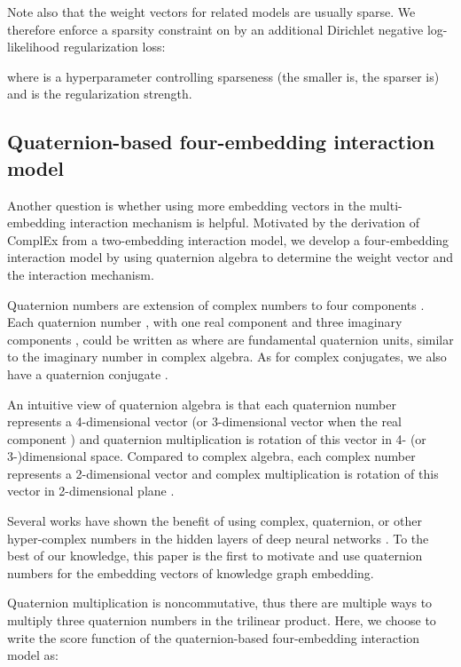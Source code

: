 \documentclass[sigconf,edbt]{acmart-edbt2019}
\begin{document}
Note also that the weight vectors for related models are usually sparse. We therefore enforce a sparsity constraint on  by an additional Dirichlet negative log-likelihood regularization loss:

where  is a hyperparameter controlling sparseness (the smaller  is, the sparser  is) and  is the regularization strength.


\subsection{Quaternion-based four-embedding interaction model}
Another question is whether using more embedding vectors in the multi-embedding interaction mechanism is helpful. Motivated by the derivation of ComplEx from a two-embedding interaction model, we develop a four-embedding interaction model by using quaternion algebra to determine the weight vector and the interaction mechanism.

Quaternion numbers are extension of complex numbers to four components \cite{kantor_hypercomplexnumberselementary_1989} \cite{goldman_rethinkingquaternions_2010}. Each quaternion number , with one real component  and three imaginary components , could be written as  where  are fundamental quaternion units, similar to the imaginary number  in complex algebra. As for complex conjugates, we also have a quaternion conjugate .

An intuitive view of quaternion algebra is that each quaternion number represents a 4-dimensional vector (or 3-dimensional vector when the real component ) and quaternion multiplication is rotation of this vector in 4- (or 3-)dimensional space. Compared to complex algebra, each complex number represents a 2-dimensional vector and complex multiplication is rotation of this vector in 2-dimensional plane \cite{ahlfors_complexanalysisintroduction_1953}.

Several works have shown the benefit of using complex, quaternion, or other hyper-complex numbers in the hidden layers of deep neural networks \cite{guberman_complexvaluedconvolutional_2016} \cite{minemoto_feedforwardneural_2017} \cite{parcollet_quaternionrecurrentneural_2019}. To the best of our knowledge, this paper is the first to motivate and use quaternion numbers for the embedding vectors of knowledge graph embedding.

Quaternion multiplication is noncommutative, thus there are multiple ways to multiply three quaternion numbers in the trilinear product. Here, we choose to write the score function of the quaternion-based four-embedding interaction model as:
\end{document}
